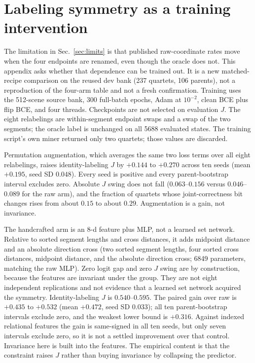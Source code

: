 \section{Labeling symmetry as a training intervention}
\label{sec:l015}

The limitation in Sec.~\ref{sec:limits} is that published raw-coordinate rates move when the four endpoints are renamed, even though the oracle does not. This appendix asks whether that dependence can be trained out. It is a new matched-recipe comparison on the reused dev bank (237 quartets, 106 parents), not a reproduction of the four-arm table and not a fresh confirmation. Training uses the 512-scene source bank, 300 full-batch epochs, Adam at $10^{-2}$, clean BCE plus flip BCE, and four threads. Checkpoints are not selected on evaluation $J$. The eight relabelings are within-segment endpoint swaps and a swap of the two segments; the oracle label is unchanged on all 5688 evaluated states. The training script's own miner returned only two quartets; those values are discarded.

Permutation augmentation, which averages the same two loss terms over all eight relabelings, raises identity-labeling $J$ by $+0.144$ to $+0.270$ across ten seeds (mean $+0.195$, seed SD $0.048$). Every seed is positive and every parent-bootstrap interval excludes zero. Absolute $J$ swing does not fall ($0.063$--$0.156$ versus $0.046$--$0.089$ for the raw arm), and the fraction of quartets whose joint-correctness bit changes rises from about $0.15$ to about $0.29$. Augmentation is a gain, not invariance.

The handcrafted arm is an 8-d feature plus MLP, not a learned set network. Relative to sorted segment lengths and cross distances, it adds midpoint distance and an absolute direction cross (two sorted segment lengths, four sorted cross distances, midpoint distance, and the absolute direction cross; 6849 parameters, matching the raw MLP). Zero logit gap and zero $J$ swing are by construction, because the features are invariant under the group. They are not eight independent replications and not evidence that a learned set network acquired the symmetry. Identity-labeling $J$ is $0.540$--$0.595$. The paired gain over raw is $+0.435$ to $+0.532$ (mean $+0.472$, seed SD $0.033$); all ten parent-bootstrap intervals exclude zero, and the weakest lower bound is $+0.316$. Against indexed relational features the gain is same-signed in all ten seeds, but only seven intervals exclude zero, so it is not a settled improvement over that control. Invariance here is built into the features. The empirical content is that the constraint raises $J$ rather than buying invariance by collapsing the predictor.

